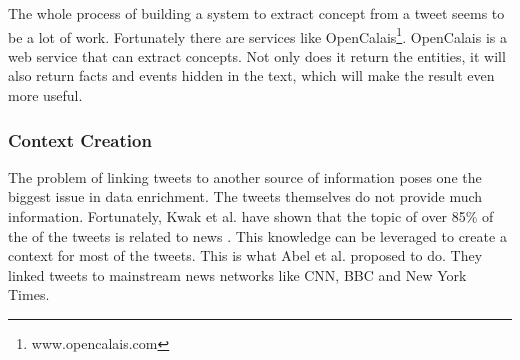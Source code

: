 \documentclass{article}
\begin{document}
The whole process of building a system to extract concept from a tweet seems to be a lot of work. Fortunately there are services like OpenCalais\footnote{www.opencalais.com}. OpenCalais is a web service that can extract concepts. Not only does it return the entities, it will also return facts and events hidden in the text, which will make the result even more useful.
\subsubsection*{Context Creation}
The problem of linking tweets to another source of information poses one the biggest issue in data enrichment. The tweets themselves do not provide much information. Fortunately, Kwak et al. have shown that the topic of over 85\% of the of the tweets is related to news \cite{newsmedia}. This knowledge can be leveraged to create a context for most of the tweets.  This is what Abel et al. proposed to do\cite{enrichmentForProfiling}. They linked tweets to mainstream news networks like CNN, BBC and New York Times.
\end{document}
